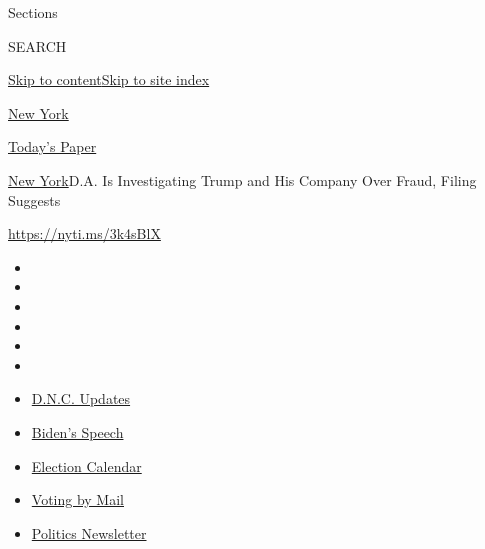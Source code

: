 Sections

SEARCH

\protect\hyperlink{site-content}{Skip to
content}\protect\hyperlink{site-index}{Skip to site index}

\href{https://www.nytimes3xbfgragh.onion/section/nyregion}{New York}

\href{https://myaccount.nytimes3xbfgragh.onion/auth/login?response_type=cookie\&client_id=vi}{}

\href{https://www.nytimes3xbfgragh.onion/section/todayspaper}{Today's
Paper}

\href{/section/nyregion}{New York}\textbar{}D.A. Is Investigating Trump
and His Company Over Fraud, Filing Suggests

\url{https://nyti.ms/3k4sBlX}

\begin{itemize}
\item
\item
\item
\item
\item
\item
\end{itemize}

\begin{itemize}
\item
  \href{https://www.nytimes3xbfgragh.onion/live/2020/08/20/us/dnc-convention-election?action=click\&pgtype=Article\&state=default\&region=TOP_BANNER\&context=storylines_menu}{D.N.C.
  Updates}
\item
  \href{https://www.nytimes3xbfgragh.onion/2020/08/20/us/politics/biden-presidential-nomination-dnc.html?action=click\&pgtype=Article\&state=default\&region=TOP_BANNER\&context=storylines_menu}{Biden's
  Speech}
\item
  \href{https://www.nytimes3xbfgragh.onion/interactive/2019/us/elections/2020-presidential-election-calendar.html?action=click\&pgtype=Article\&state=default\&region=TOP_BANNER\&context=storylines_menu}{Election
  Calendar}
\item
  \href{https://www.nytimes3xbfgragh.onion/interactive/2020/08/11/us/politics/vote-by-mail-us-states.html?action=click\&pgtype=Article\&state=default\&region=TOP_BANNER\&context=storylines_menu}{Voting
  by Mail}
\item
  \href{https://www.nytimes3xbfgragh.onion/newsletters/politics?action=click\&pgtype=Article\&state=default\&region=TOP_BANNER\&context=storylines_menu}{Politics
  Newsletter}
\end{itemize}

